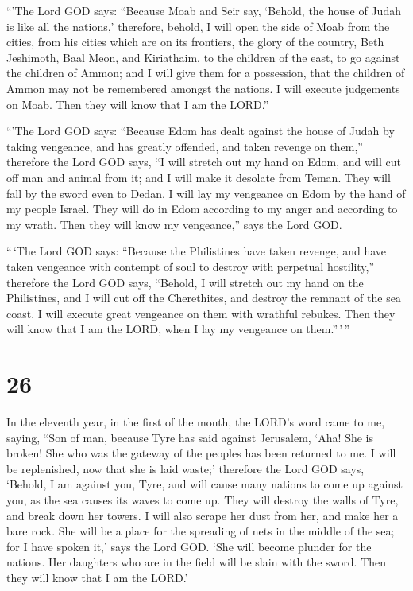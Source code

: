  ``'The Lord GOD says: ``Because Moab and Seir say, `Behold,
the house of Judah is like all the nations,'  therefore,
behold, I will open the side of Moab from the cities, from his cities
which are on its frontiers, the glory of the country, Beth Jeshimoth,
Baal Meon, and Kiriathaim,  to the children of the east, to
go against the children of Ammon; and I will give them for a possession,
that the children of Ammon may not be remembered amongst the nations.
 I will execute judgements on Moab. Then they will know
that I am the LORD.''

 ``'The Lord GOD says: ``Because Edom has dealt against the
house of Judah by taking vengeance, and has greatly offended, and taken
revenge on them,''  therefore the Lord GOD says, ``I will
stretch out my hand on Edom, and will cut off man and animal from it;
and I will make it desolate from Teman. They will fall by the sword even
to Dedan.  I will lay my vengeance on Edom by the hand of
my people Israel. They will do in Edom according to my anger and
according to my wrath. Then they will know my vengeance,'' says the Lord
GOD.

 ``\,`The Lord GOD says: ``Because the Philistines have
taken revenge, and have taken vengeance with contempt of soul to destroy
with perpetual hostility,''  therefore the Lord GOD says,
``Behold, I will stretch out my hand on the Philistines, and I will cut
off the Cherethites, and destroy the remnant of the sea coast.
 I will execute great vengeance on them with wrathful
rebukes. Then they will know that I am the LORD, when I lay my vengeance
on them.''\,'\,''

\hypertarget{section-24}{%
\section{26}\label{section-24}}

 In the eleventh year, in the first of the month, the LORD's
word came to me, saying,  ``Son of man, because Tyre has
said against Jerusalem, `Aha! She is broken! She who was the gateway of
the peoples has been returned to me. I will be replenished, now that she
is laid waste;'  therefore the Lord GOD says, `Behold, I am
against you, Tyre, and will cause many nations to come up against you,
as the sea causes its waves to come up.  They will destroy
the walls of Tyre, and break down her towers. I will also scrape her
dust from her, and make her a bare rock.  She will be a
place for the spreading of nets in the middle of the sea; for I have
spoken it,' says the Lord GOD. `She will become plunder for the nations.
 Her daughters who are in the field will be slain with the
sword. Then they will know that I am the LORD.'

